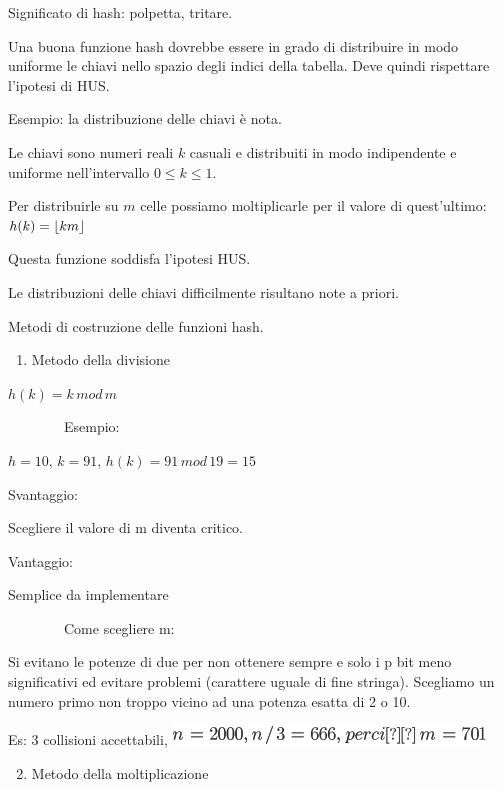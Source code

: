 \documentclass{article}
\DeclarePairedDelimiter\floor{\lfloor}{\rfloor}
\providecommand{\tightlist}{%
  \setlength{\itemsep}{0pt}\setlength{\parskip}{0pt}}
\begin{document}
{Significato di hash: polpetta, tritare.}

{Una buona funzione hash dovrebbe essere in grado di distribuire in modo
uniforme le chiavi nello spazio degli indici della tabella. Deve quindi
rispettare l'ipotesi di HUS.}

{Esempio: la distribuzione delle chiavi è nota.}

{Le chiavi sono numeri reali $k$ casuali e distribuiti in modo indipendente e uniforme nell'intervallo $0 \leq k \leq 1$.}

{Per distribuirle su $m$ celle possiamo moltiplicarle per il valore di quest'ultimo: $h(k) = \floor{km}$}

{Questa funzione soddisfa l'ipotesi HUS.}

{Le distribuzioni delle chiavi difficilmente risultano note a priori. }

{Metodi di costruzione delle funzioni hash.}

\begin{enumerate}
\tightlist
\item
  {Metodo della divisione}
\end{enumerate}

{}

$h(k) = k\,mod\,m$

{~~~~~~~~Esempio: }

$h=10,\,k=91,\,h(k)=91\,mod\,19=15$

{}

{Svantaggio: }

{Scegliere il valore di m diventa critico. }

{}

{Vantaggio:}

{Semplice da implementare}

{}

{~~~~~~~~Come scegliere m:}

{Si evitano le potenze di due per non ottenere sempre e solo i p bit
meno significativi ed evitare problemi (carattere uguale di fine
stringa). Scegliamo un numero primo non troppo vicino ad una potenza
esatta di 2 o 10.}

{Es: 3 collisioni accettabili, }\includegraphics{images/image257.png}

{}

{}

\begin{enumerate}
\setcounter{enumi}{1}
\tightlist
\item
  {Metodo della moltiplicazione}
\end{enumerate}
\end{document}
